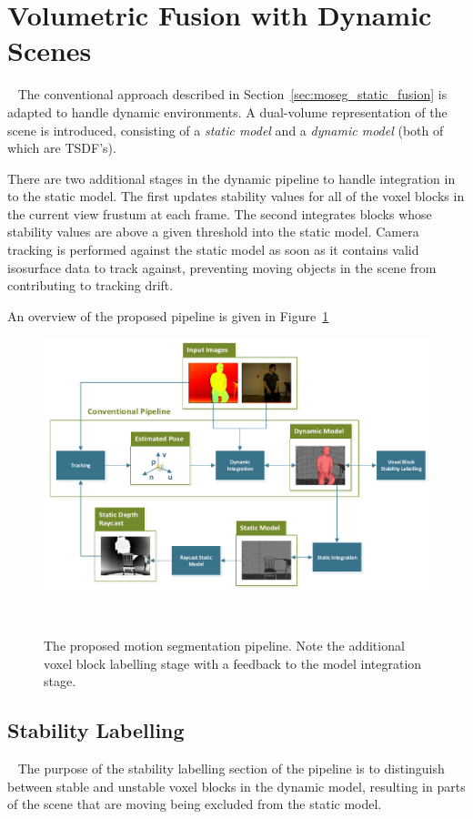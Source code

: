 \section{Volumetric Fusion with Dynamic Scenes}
~\label{sec:moseg_dynamic_fusion}
The conventional approach described in Section~\ref{sec:moseg_static_fusion} is adapted to handle dynamic 
environments. A dual-volume representation of the scene is introduced, consisting of a \emph{static model}
and a \emph{dynamic model} (both of which are TSDF's).

There are two additional stages in the dynamic pipeline to handle integration in
to the static model. The first updates stability values for all of the voxel
blocks in the current view frustum at each frame. The second integrates blocks
whose stability values are above a given threshold into the static model.
Camera tracking is performed against the static model as soon as it contains
valid isosurface data to track against, preventing moving objects in the scene
from contributing to tracking drift.

An overview of the proposed pipeline is given in Figure~\ref{figure:moseg_pipeline}
\begin{figure}[!htbp]
  \centering
  \includegraphics[width=\linewidth]{figures/moseg/pipeline.pdf}
  \caption[Motion Segmentation Pipeline]{The proposed motion segmentation pipeline. 
  Note the additional voxel block labelling stage with a feedback to the model 
  integration stage.}
~\label{figure:moseg_pipeline}
\end{figure}

\subsection{Stability Labelling}
~\label{sub:moseg_stability_labelling}
The purpose of the stability labelling section of the pipeline is to distinguish
between stable and unstable voxel blocks in the dynamic model, resulting in
parts of the scene that are moving being excluded from the static model.

